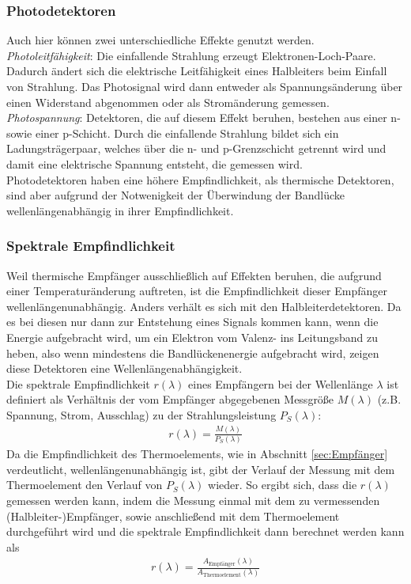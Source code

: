 \documentclass[a4paper,twoside,final]{article}
\begin{document}
\subsubsection{Photodetektoren}
Auch hier können zwei unterschiedliche Effekte genutzt werden.\\
\emph{Photoleitfähigkeit}: Die einfallende Strahlung erzeugt Elektronen-Loch-Paare. Dadurch ändert sich die elektrische Leitfähigkeit eines Halbleiters beim Einfall von Strahlung. Das Photosignal wird dann entweder als Spannungsänderung über einen Widerstand abgenommen oder als Stromänderung gemessen. \\
\emph{Photospannung}: Detektoren, die auf diesem Effekt beruhen, bestehen aus einer n- sowie einer p-Schicht. Durch die einfallende Strahlung bildet sich ein Ladungsträgerpaar, welches über die n- und p-Grenzschicht getrennt wird und damit eine elektrische Spannung entsteht, die gemessen wird. \\
Photodetektoren haben eine höhere Empfindlichkeit, als thermische Detektoren, sind aber aufgrund der Notwenigkeit der Überwindung der Bandlücke wellenlängenabhängig in ihrer Empfindlichkeit.

\subsubsection{Spektrale Empfindlichkeit}
Weil thermische Empfänger ausschließlich auf Effekten beruhen, die aufgrund einer Temperaturänderung auftreten, ist die Empfindlichkeit dieser Empfänger wellenlängenunabhängig. Anders verhält es sich mit den Halbleiterdetektoren. Da es bei diesen nur dann zur Entstehung eines Signals kommen kann, wenn die Energie aufgebracht wird, um ein Elektron vom Valenz- ins Leitungsband zu heben, also wenn mindestens die Bandlückenenergie aufgebracht wird, zeigen diese Detektoren eine Wellenlängenabhängigkeit. \\
Die spektrale Empfindlichkeit $r(\lambda)$ eines Empfängern bei der Wellenlänge $\lambda$ ist definiert als Verhältnis der vom Empfänger abgegebenen Messgröße $M(\lambda)$ (z.B. Spannung, Strom, Ausschlag) zu der Strahlungsleistung $P_S(\lambda)$:
\begin{align}
  r(\lambda) = \frac{M(\lambda)}{P_S(\lambda)}
\end{align}
Da die Empfindlichkeit des Thermoelements, wie in Abschnitt \ref{sec:Empfänger} verdeutlicht, wellenlängenunabhängig ist, gibt der Verlauf der Messung mit dem Thermoelement den Verlauf von $P_S(\lambda)$ wieder. So ergibt sich, dass die $r(\lambda)$ gemessen werden kann, indem die Messung einmal mit dem zu vermessenden (Halbleiter-)Empfänger, sowie anschließend mit dem Thermoelement durchgeführt wird und die spektrale Empfindlichkeit dann berechnet werden kann als
\begin{align}
  r(\lambda) = \frac{A_\text{Empfänger}(\lambda)}{A_\text{Thermoelement}(\lambda)}
\end{align}
\end{document}
